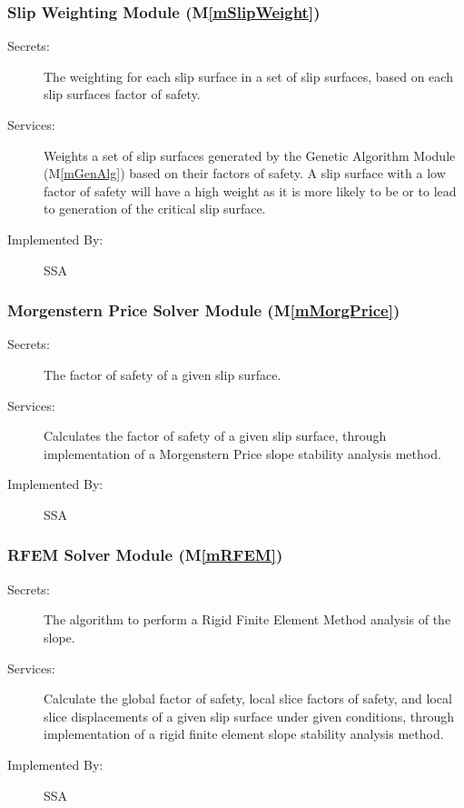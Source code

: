 \documentclass[12pt]{article}
\newcommand{\mref}[1]{M\ref{#1}}
\newcommand{\progname}[1]{SSA}
\begin{document}
\subsubsection{Slip Weighting Module (\mref{mSlipWeight})}

\begin{description}
\item[Secrets:] The weighting for each slip surface in a set of slip
  surfaces, based on each slip surfaces factor of safety.
\item[Services:] Weights a set of slip surfaces generated by the
  Genetic Algorithm Module (\mref{mGenAlg}) based on their factors of
  safety. A slip surface with a low factor of safety will have a high
  weight as it is more likely to be or to lead to generation of the
  critical slip surface.
\item[Implemented By:] \progname{}
\end{description} 

\subsubsection{Morgenstern Price Solver Module (\mref{mMorgPrice})}

\begin{description}
\item[Secrets:] The factor of safety of a given slip surface.
\item[Services:] Calculates the factor of safety of a given slip
  surface, through implementation of a Morgenstern Price slope
  stability analysis method.
\item[Implemented By:] \progname{}
\end{description} 


\subsubsection{RFEM Solver Module (\mref{mRFEM})}

\begin{description}
\item[Secrets:] The algorithm to perform a Rigid Finite Element Method
  analysis of the slope.
\item[Services:] Calculate the global factor of safety, local slice
  factors of safety, and local slice displacements of a given slip
  surface under given conditions, through implementation of a rigid
  finite element slope stability analysis method.
\item[Implemented By:] \progname{}
\end{description}
\end{document}
